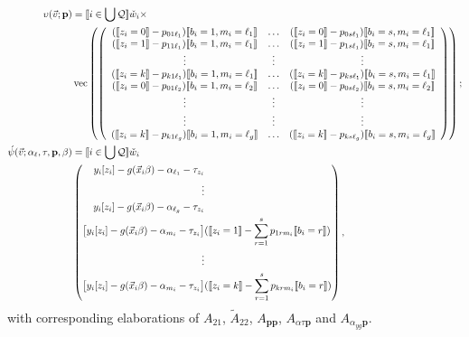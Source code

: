 \documentclass{article}
\DeclarePairedDelimiter{\indicator}{\llbracket}{\rrbracket}
\newcommand{\owt}[1][{[z_{i}]}]{\ensuremath{\check{w}_{i#1}}}
\newcommand{\absorbInterceptsEF}{\upsilon}
\begin{document}
\begin{align}
  \absorbInterceptsEF(\vec{v}; \mathbf{p}) &=
                                             \indicator{i \in \bigcup \mathcal{Q}} \owt[] \times \nonumber \\
  &\operatorname{vec}\left(%
    \left(
    \begin{array}{ccc}
      (\indicator{z_{i}=0}-p_{01\ell_{1}})\indicator{b_{i}=1, m_{i}=\ell_{1}}
      &\ldots
      &
        (\indicator{z_{i}=0}-p_{0s\ell_{1}})\indicator{b_{i}=s, m_{i}=\ell_{1}}
      \\
      (\indicator{z_{i}=1}-p_{11\ell_{1}})\indicator{b_{i}=1, m_{i}=\ell_{1}}
      &\ldots
      &
        (\indicator{z_{i}=1}-p_{1s\ell_{1}})\indicator{b_{i}=s, m_{i}=\ell_{1}}
      \\
      \vdots & \vdots & \vdots \\
      (\indicator{z_{i}=k}-p_{k1\ell_{1}})\indicator{b_{i}=1, m_{i}=\ell_{1}}
      &\ldots
      &
        (\indicator{z_{i}=k}-p_{ks\ell_{1}})\indicator{b_{i}=s, m_{i}=\ell_{1}}\\                                 (\indicator{z_{i}=0}-p_{01\ell_{2}})\indicator{b_{i}=1, m_{i}=\ell_{2}}
      &\ldots
      &
        (\indicator{z_{i}=0}-p_{0s\ell_{2}})\indicator{b_{i}=s, m_{i}=\ell_{2}}
      \\
      \vdots & \vdots & \vdots \\
      \vdots & \vdots & \vdots \\
      (\indicator{z_{i}=k}-p_{k1\ell_{g}})\indicator{b_{i}=1, m_{i}=\ell_{g}}
      &\ldots
      &
        (\indicator{z_{i}=k}-p_{ks\ell_{g}})\indicator{b_{i}=s, m_{i}=\ell_{g}}\\          
    \end{array}
  \right)%
  \right) ;\nonumber \\
  \acute{\psi}(\vec{v}; \alpha_{\ell}, \tau, \mathbf{p}, \beta) &=
\indicator{i \in \bigcup \mathcal{Q}}\owt[] \nonumber \\
&\left(
  \begin{aligned}                                               
   y_{i}[z_{i}]
    -
    g(\vec{x}_{i}\beta)-\alpha_{\ell_{1}}-\tau_{z_{i}}&\\
    \vdots&\\
       y_{i}[z_{i}]
    -
    g(\vec{x}_{i}\beta)-\alpha_{\ell_{g}}-\tau_{z_{i}}&\\
    \big[y_{i}[z_{i}]
    -
    g(\vec{x}_{i}\beta)-\alpha_{m_{i}}-\tau_{z_{i}}\big]
    &(
    \indicator{z_{i}=1} - \sum_{r=1}^{s}p_{1rm_{i}}\indicator{b_{i}=r})\\
    \vdots \\
    {}\big[y_{i}[z_{i}]
    - g(\vec{x}_{i}\beta) - \alpha_{m_{i}}-
    \tau_{z_{i}}\big]
    &(\indicator{z_{i}=k}
    - \sum_{r=1}^{s}p_{krm_{i}}\indicator{b_{i}=r})\\
  \end{aligned}
\right), 
\end{align}
with corresponding elaborations of $A_{21}$, $\tilde{A}_{22}$,
$A_{\mathbf{p}\mathbf{p}}$, 
$A_{\alpha\tau \mathbf{p}}$ and $A_{\alpha_{yg}\mathbf{p}}$. 
\end{document}
